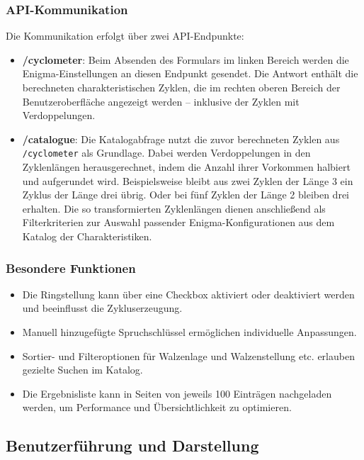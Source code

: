 \documentclass[12pt, ngerman, a4paper, numbers=noenddot]{article}
\begin{document}
\subsubsection{API-Kommunikation}

Die Kommunikation erfolgt über zwei API-Endpunkte:

\begin{itemize}
	\item \textbf{/cyclometer}: Beim Absenden des Formulars im linken Bereich werden die Enigma-Einstellungen an diesen Endpunkt gesendet. Die Antwort enthält die berechneten charakteristischen Zyklen, die im rechten oberen Bereich der Benutzeroberfläche angezeigt werden – inklusive der Zyklen mit Verdoppelungen.
	\item \textbf{/catalogue}: Die Katalogabfrage nutzt die zuvor berechneten Zyklen aus \newline \lstinline|/cyclometer| als Grundlage. Dabei werden Verdoppelungen in den Zyklenlängen herausgerechnet, indem die Anzahl ihrer Vorkommen halbiert und aufgerundet wird. Beispielsweise bleibt aus zwei Zyklen der Länge 3 ein Zyklus der Länge drei übrig. Oder bei fünf Zyklen der Länge 2 bleiben drei erhalten. Die so transformierten Zyklenlängen dienen anschließend als Filterkriterien zur Auswahl passender Enigma-Konfigurationen aus dem Katalog der Charakteristiken.
\end{itemize}


\subsubsection{Besondere Funktionen}

\begin{itemize}
	\item Die Ringstellung kann über eine Checkbox aktiviert oder deaktiviert werden und beeinflusst die Zykluserzeugung.
	\item Manuell hinzugefügte Spruchschlüssel ermöglichen individuelle Anpassungen.
	\item Sortier- und Filteroptionen für Walzenlage und Walzenstellung etc. erlauben gezielte Suchen im Katalog.
	\item Die Ergebnisliste kann in Seiten von jeweils 100 Einträgen nachgeladen werden, um Performance und Übersichtlichkeit zu optimieren.
\end{itemize}


\subsection{Benutzerführung und Darstellung}
\end{document}
